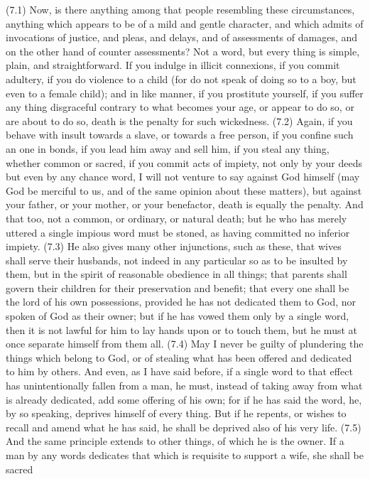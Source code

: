 (7.1) Now, is there anything among that people resembling these circumstances, anything which
appears to be of a mild and gentle character, and which admits of invocations of justice, and pleas, and
delays, and of assessments of damages, and on the other hand of counter assessments? Not a word, but
every thing is simple, plain, and straightforward. If you indulge in illicit connexions, if you commit
adultery, if you do violence to a child (for do not speak of doing so to a boy, but even to a female child);
and in like manner, if you prostitute yourself, if you suffer any thing disgraceful contrary to what
becomes your age, or appear to do so, or are about to do so, death is the penalty for such wickedness.
(7.2) Again, if you behave with insult towards a slave, or towards a free person, if you confine such an
one in bonds, if you lead him away and sell him, if you steal any thing, whether common or sacred, if
you commit acts of impiety, not only by your deeds but even by any chance word, I will not venture to
say against God himself (may God be merciful to us, and of the same opinion about these matters), but
against your father, or your mother, or your benefactor, death is equally the penalty. And that too, not
a common, or ordinary, or natural death; but he who has merely uttered a single impious word must be
stoned, as having committed no inferior impiety. (7.3) He also gives many other injunctions, such as
these, that wives shall serve their husbands, not indeed in any particular so as to be insulted by them,
but in the spirit of reasonable obedience in all things; that parents shall govern their children for their
preservation and benefit; that every one shall be the lord of his own possessions, provided he has not
dedicated them to God, nor spoken of God as their owner; but if he has vowed them only by a single
word, then it is not lawful for him to lay hands upon or to touch them, but he must at once separate
himself from them all. (7.4) May I never be guilty of plundering the things which belong to God, or of
stealing what has been offered and dedicated to him by others. And even, as I have said before, if a
single word to that effect has unintentionally fallen from a man, he must, instead of taking away from
what is already dedicated, add some offering of his own; for if he has said the word, he, by so speaking,
deprives himself of every thing. But if he repents, or wishes to recall and amend what he has said, he
shall be deprived also of his very life. (7.5) And the same principle extends to other things, of which he is
the owner. If a man by any words dedicates that which is requisite to support a wife, she shall be sacred
